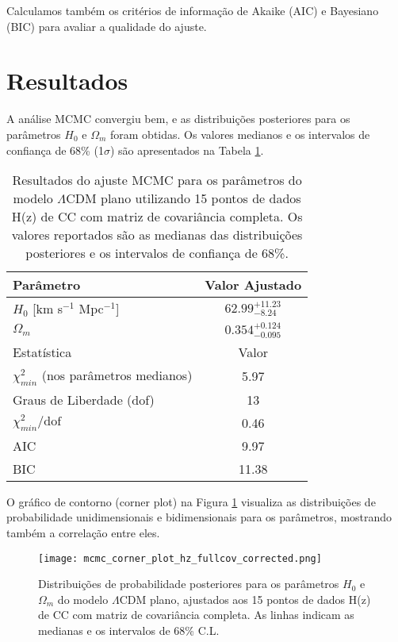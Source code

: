 \documentclass[11pt,a4paper]{article}
\begin{document}
Calculamos também os critérios de informação de Akaike (AIC) e Bayesiano (BIC) para avaliar a qualidade do ajuste.

\section{Resultados}

A análise MCMC convergiu bem, e as distribuições posteriores para os parâmetros $H_0$ e $\Omega_m$ foram obtidas. Os valores medianos e os intervalos de confiança de 68\% (1$\sigma$) são apresentados na Tabela \ref{tab:mcmc_results}.

\begin{table}[htbp]
\centering
\caption{Resultados do ajuste MCMC para os parâmetros do modelo $\Lambda$CDM plano utilizando 15 pontos de dados H(z) de CC com matriz de covariância completa. Os valores reportados são as medianas das distribuições posteriores e os intervalos de confiança de 68\%.}
\label{tab:mcmc_results}
\begin{tabular}{lc}
\toprule
Parâmetro & Valor Ajustado \\
\midrule
$H_0$ [km s$^{-1}$ Mpc$^{-1}$] & $62.99^{+11.23}_{-8.24}$ \\
$\Omega_m$ & $0.354^{+0.124}_{-0.095}$ \\
\midrule
Estatística & Valor \\
\midrule
$\chi^2_{min}$ (nos parâmetros medianos) & 5.97 \\
Graus de Liberdade (dof) & 13 \\
$\chi^2_{min} / \text{dof}$ & 0.46 \\
AIC & 9.97 \\
BIC & 11.38 \\
\bottomrule
\end{tabular}
\end{table}

O gráfico de contorno (corner plot) na Figura \ref{fig:corner} visualiza as distribuições de probabilidade unidimensionais e bidimensionais para os parâmetros, mostrando também a correlação entre eles.

\begin{figure}[htbp]
\centering
\texttt{[image: mcmc\_corner\_plot\_hz\_fullcov\_corrected.png]}
\caption{Distribuições de probabilidade posteriores para os parâmetros $H_0$ e $\Omega_m$ do modelo $\Lambda$CDM plano, ajustados aos 15 pontos de dados H(z) de CC com matriz de covariância completa. As linhas indicam as medianas e os intervalos de 68\% C.L.}
\label{fig:corner}
\end{figure}
\end{document}
